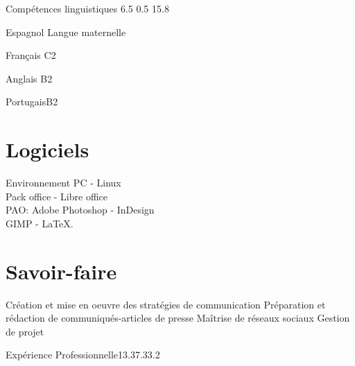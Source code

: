 \documentclass[30pt, french]{tccv}
\begin{document}
\begin{upshape}
\begin{rounded_frame}{Compétences linguistiques}{ 6.5 } { 0.5 }{ 15.8 }{}


\begin{factlist}
\item{Espagnol} {Langue maternelle}	
\item{Français} {C2}	
\item{Anglais}  {B2}	
\item{Portugais}{B2}
\end{factlist}

\vspace{0.5cm}
\section{Logiciels}
Environnement PC - Linux \\
Pack office - Libre office \\
PAO: Adobe Photoshop - InDesign \\
GIMP -
\LaTeX.

\vspace{0.1cm}
\section{Savoir-faire}
\begin{itemize}[leftmargin=13pt]
  \cvitem[\checkmark]  Création et mise en oeuvre des stratégies de communication
  \cvitem[\checkmark]  Préparation et rédaction de communiqués-articles de presse
  \cvitem[\checkmark]  Maîtrise de réseaux sociaux
  \cvitem[\checkmark]  Gestion de projet 
\end{itemize}



\end{rounded_frame}




%
%



\begin{flat_frame}{Expérience Professionnelle}{13.3}{7.3}{3.2}{}
\begin{eventlist}




\end{eventlist}
\end{flat_frame}
\end{upshape}
\end{document}
